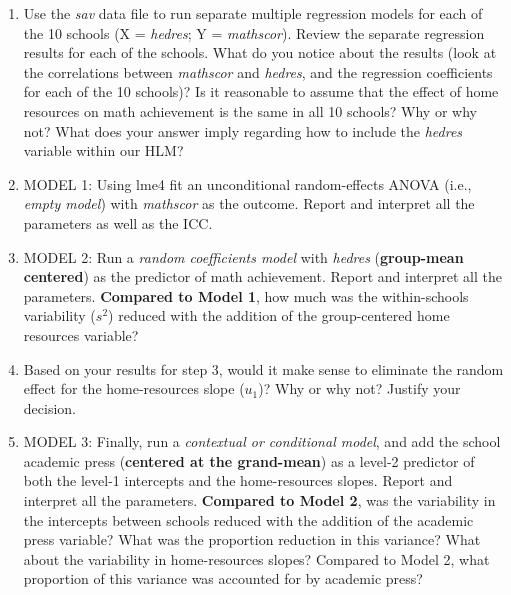 \documentclass[]{article}
\begin{document}
\begin{enumerate}
\def\labelenumi{\arabic{enumi}.}
\item
  Use the \emph{sav} data file to run separate multiple regression
  models for each of the 10 schools (X = \emph{hedres}; Y =
  \emph{mathscor}). Review the separate regression results for each of
  the schools. What do you notice about the results (look at the
  correlations between \emph{mathscor} and \emph{hedres}, and the
  regression coefficients for each of the 10 schools)? Is it reasonable
  to assume that the effect of home resources on math achievement is the
  same in all 10 schools? Why or why not? What does your answer imply
  regarding how to include the \emph{hedres} variable within our HLM?
\item
  MODEL 1: Using lme4 fit an unconditional random-effects ANOVA (i.e.,
  \emph{empty model}) with \emph{mathscor} as the outcome. Report and
  interpret all the parameters as well as the ICC.
\item
  MODEL 2: Run a \emph{random coefficients model} with \emph{hedres}
  (\textbf{group-mean centered}) as the predictor of math achievement.
  Report and interpret all the parameters. \textbf{Compared to Model 1},
  how much was the within-schools variability (\(s^2\)) reduced with the
  addition of the group-centered home resources variable?
\item
  Based on your results for step 3, would it make sense to eliminate the
  random effect for the home-resources slope (\(u_1\))? Why or why not?
  Justify your decision.
\item
  MODEL 3: Finally, run a \emph{contextual or conditional model}, and
  add the school academic press (\textbf{centered at the grand-mean}) as
  a level-2 predictor of both the level-1 intercepts and the
  home-resources slopes. Report and interpret all the parameters.
  \textbf{Compared to Model 2}, was the variability in the intercepts
  between schools reduced with the addition of the academic press
  variable? What was the proportion reduction in this variance? What
  about the variability in home-resources slopes? Compared to Model 2,
  what proportion of this variance was accounted for by academic press?
\end{enumerate}
\end{document}
